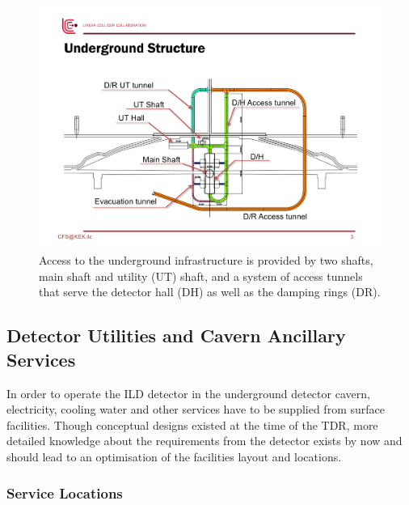 \begin{figure}[h!]
\includegraphics[width=1.0\hsize]{Integration/fig/Access.pdf}
\caption{\label{fig:integration:access}Access to the underground infrastructure is provided by two shafts, main shaft and utility (UT) shaft, and a system of access tunnels~\cite{ild:bib:Access} that serve the detector hall (DH) as well as the damping rings (DR). }
\end{figure}
\vspace{2cm}

\subsection{Detector Utilities and Cavern Ancillary Services}


In order to operate the ILD detector in the underground detector cavern, electricity, cooling water and other services have to be supplied from surface facilities. Though conceptual designs existed at the time of the TDR, more detailed knowledge about the requirements from the detector exists by now and should lead to an optimisation of the facilities layout and locations.


\subsubsection{Service Locations}
\label{ild:sec:service_locations}

